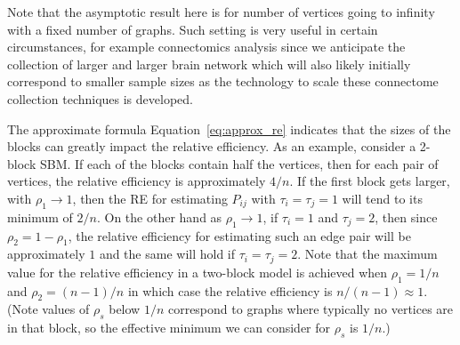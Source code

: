 Note that the asymptotic result here is for number of vertices going to infinity with a fixed number of graphs. Such setting is very useful in certain circumstances, for example connectomics analysis since we anticipate the collection of larger and larger brain network which will also likely initially correspond to smaller sample sizes as the technology to scale these connectome collection techniques is developed.

The approximate formula Equation~\ref{eq:approx_re} indicates that the sizes of the blocks can greatly impact the relative efficiency.
As an example, consider a 2-block SBM. 
If each of the blocks contain half the vertices, then for each pair of vertices, the relative efficiency is approximately $4/n$. 
If the first block gets larger, with $\rho_1\to 1$, then the RE for estimating $P_{ij}$ with $\tau_i=\tau_j=1$ will tend to its minimum of $2/n$. 
On the other hand as $\rho_1\to 1$, if $\tau_i=1$ and $\tau_j=2$, then since $\rho_2=1-\rho_1$, the relative efficiency for estimating such an edge pair will be approximately $1$ and the same will hold if $\tau_i=\tau_j=2$.
Note that the maximum value for the relative efficiency in a two-block model is achieved when $\rho_1=1/n$ and $\rho_2=(n-1)/n$ in which case the relative efficiency is $n/(n-1) \approx 1$.
(Note values of $\rho_s$ below $1/n$ correspond to graphs where typically no vertices are in that block, so the effective minimum we can consider for $\rho_s$ is $1/n$.)

